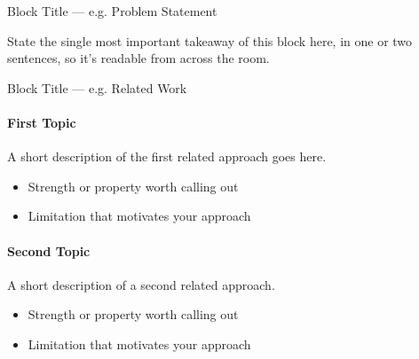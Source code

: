 \documentclass[final,dvipsnames]{beamer}
\newlength{\colWidth}
\begin{document}
\begin{frame}[t]
\begin{columns}[t]
\begin{column}{\colWidth}
\begin{block}{Block Title --- e.g. Problem Statement}
          \begin{highlight}
            State the single most important takeaway of this block here, in one or two
            sentences, so it's readable from across the room.
          \end{highlight}

        \end{block}

        \vspace*{-0.25\baselineskip}

        \begin{block}{Block Title --- e.g. Related Work}

          \paragraph{First Topic} A short description of the first related approach goes here.
          \begin{itemize}
            \item Strength or property worth calling out
            \item Limitation that motivates your approach
          \end{itemize}

          \paragraph{Second Topic} A short description of a second related approach.
          \begin{itemize}
            \item Strength or property worth calling out
            \item Limitation that motivates your approach
          \end{itemize}


\end{block}
\end{column}
\end{columns}
\end{frame}
\end{document}
